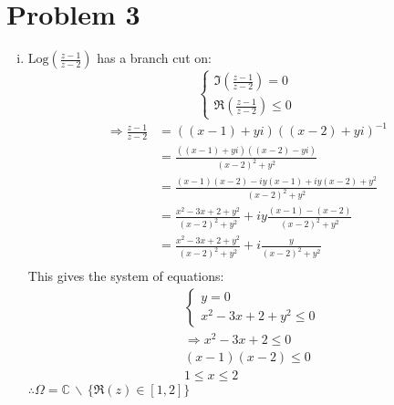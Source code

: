 \documentclass[a4paper, titlepage, DIV=14]{scrartcl}
\newcommand{\Log}{\text{Log}}
\begin{document}
    \section*{Problem 3}
    \begin{enumerate}[(i)]
        \item $\Log(\frac{z-1}{z-2})$ has a branch cut on:
        \[
            \begin{cases}
                \Im(\frac{z-1}{z-2}) = 0 \\
                \Re(\frac{z-1}{z-2}) \leq 0
            \end{cases}    
        \]
        \begin{align*}
            \Rightarrow \frac{z-1}{z-2} &= ((x-1)+yi)((x-2)+yi)^{-1} \\
                &= \frac{((x-1)+yi)((x-2)-yi)}{(x-2)^{2}+y^{2}} \\
                &= \frac{(x-1)(x-2) - iy(x-1) + iy(x-2) + y^{2}}{(x-2)^{2}+y^{2}} \\
                &= \frac{x^{2}-3x+2+y^{2}}{(x-2)^{2}+y^{2}} + iy\frac{(x-1)-(x-2)}{(x-2)^{2}+y^{2}} \\
                &= \frac{x^{2}-3x+2+y^{2}}{(x-2)^{2}+y^{2}} + i\frac{y}{(x-2)^{2}+y^{2}} \\
        \end{align*}
        This gives the system of equations:
          \begin{align*}
              &\begin{cases}
                y = 0 \\
                x^{2}-3x+2+y^{2} \leq 0
              \end{cases} \\
              &\Rightarrow x^{2}-3x+2 \leq 0 \\
              &(x-1)(x-2) \leq 0 \\
              & 1 \leq x \leq 2
          \end{align*} 
        $\therefore \Omega = \mathbb{C} \, \backslash \, \{\Re(z) \in [1,2]\}$
        

\end{enumerate}
\end{document}
